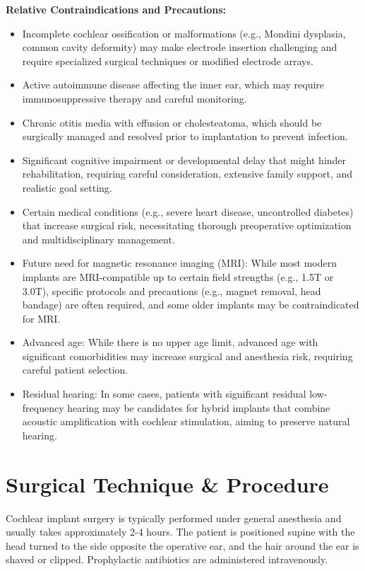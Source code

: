 \textbf{Relative Contraindications and Precautions:}
\begin{itemize}
  \item Incomplete cochlear ossification or malformations (e.g., Mondini dysplasia, common cavity deformity) may make electrode insertion challenging and require specialized surgical techniques or modified electrode arrays.
  \item Active autoimmune disease affecting the inner ear, which may require immunosuppressive therapy and careful monitoring.
  \item Chronic otitis media with effusion or cholesteatoma, which should be surgically managed and resolved prior to implantation to prevent infection.
  \item Significant cognitive impairment or developmental delay that might hinder rehabilitation, requiring careful consideration, extensive family support, and realistic goal setting.
  \item Certain medical conditions (e.g., severe heart disease, uncontrolled diabetes) that increase surgical risk, necessitating thorough preoperative optimization and multidisciplinary management.
  \item Future need for magnetic resonance imaging (MRI): While most modern implants are MRI-compatible up to certain field strengths (e.g., 1.5T or 3.0T), specific protocols and precautions (e.g., magnet removal, head bandage) are often required, and some older implants may be contraindicated for MRI.
  \item Advanced age: While there is no upper age limit, advanced age with significant comorbidities may increase surgical and anesthesia risk, requiring careful patient selection.
  \item Residual hearing: In some cases, patients with significant residual low-frequency hearing may be candidates for hybrid implants that combine acoustic amplification with cochlear stimulation, aiming to preserve natural hearing.
\end{itemize}

\section*{Surgical Technique \& Procedure}
Cochlear implant surgery is typically performed under general anesthesia and usually takes approximately 2-4 hours. The patient is positioned supine with the head turned to the side opposite the operative ear, and the hair around the ear is shaved or clipped. Prophylactic antibiotics are administered intravenously.

